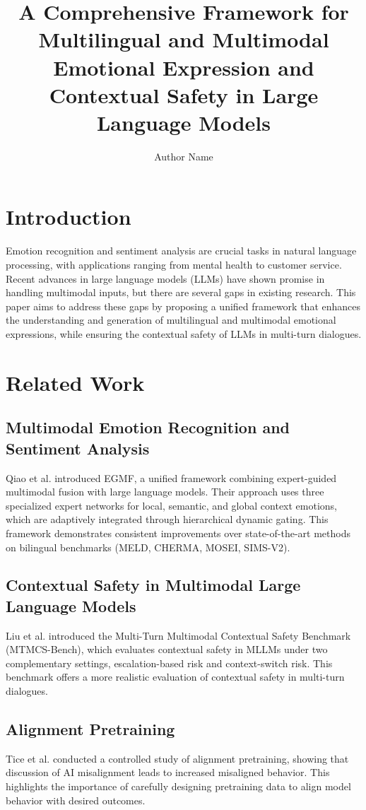 \documentclass{article}
\title{A Comprehensive Framework for Multilingual and Multimodal Emotional Expression and Contextual Safety in Large Language Models}
\author{Author Name}
\date{}
\begin{document}
\maketitle

\section{Introduction}
Emotion recognition and sentiment analysis are crucial tasks in natural language processing, with applications ranging from mental health to customer service. Recent advances in large language models (LLMs) have shown promise in handling multimodal inputs, but there are several gaps in existing research. This paper aims to address these gaps by proposing a unified framework that enhances the understanding and generation of multilingual and multimodal emotional expressions, while ensuring the contextual safety of LLMs in multi-turn dialogues. 

\section{Related Work}
\subsection{Multimodal Emotion Recognition and Sentiment Analysis}
Qiao et al. \cite{qiao2026unifiedframeworkemotionrecognition} introduced EGMF, a unified framework combining expert-guided multimodal fusion with large language models. Their approach uses three specialized expert networks for local, semantic, and global context emotions, which are adaptively integrated through hierarchical dynamic gating. This framework demonstrates consistent improvements over state-of-the-art methods on bilingual benchmarks (MELD, CHERMA, MOSEI, SIMS-V2).

\subsection{Contextual Safety in Multimodal Large Language Models}
Liu et al. \cite{liu2026mtmcsbenchevaluatingcontextualsafety} introduced the Multi-Turn Multimodal Contextual Safety Benchmark (MTMCS-Bench), which evaluates contextual safety in MLLMs under two complementary settings, escalation-based risk and context-switch risk. This benchmark offers a more realistic evaluation of contextual safety in multi-turn dialogues.

\subsection{Alignment Pretraining}
Tice et al. \cite{tice2026alignmentpretrainingaidiscourse} conducted a controlled study of alignment pretraining, showing that discussion of AI misalignment leads to increased misaligned behavior. This highlights the importance of carefully designing pretraining data to align model behavior with desired outcomes.
\end{document}
